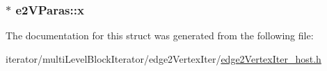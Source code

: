 \label{structe2VParas_aa47e1f24e424418952a31e4d943b961e}
\hypertarget{structe2VParas_a5d3d9444ff7cd409f4c555110ce4d892}{
\subsubsection[{x}]{$\ast$ {\bf e2VParas::x}}}
\label{structe2VParas_a5d3d9444ff7cd409f4c555110ce4d892}


The documentation for this struct was generated from the following file:\begin{DoxyCompactItemize}
\item 
iterator/multiLevelBlockIterator/edge2VertexIter/\hyperlink{edge2VertexIter__host_8h}{edge2VertexIter\_\-host.h}\end{DoxyCompactItemize}
